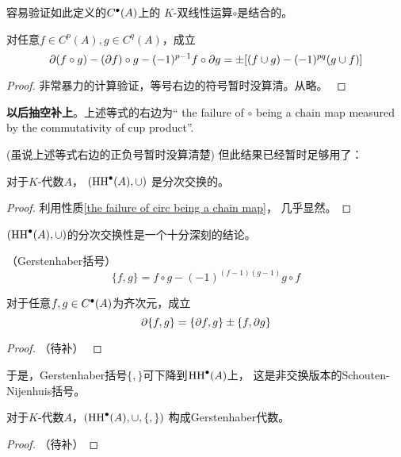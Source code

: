 容易验证如此定义的$C^{\bullet}(A)$上的
$K$-双线性运算$\circ$是结合的。


\begin{prop}
\label{the failure of circ being a chain map}
对任意$f\in C^p(A),g\in C^q(A)$，成立
$$\partial(f\circ g)-(\partial f)\circ g-(-1)^{p-1}f\circ\partial g
=\pm[(f\cup g)-(-1)^{pq}(g\cup f)]$$
\end{prop}

\begin{proof}
{
非常暴力的计算验证，等号右边的符号暂时没算清。从略。
}
\end{proof}

\textbf{以后抽空补上}。上述等式的右边为“
the failure of $\circ$ being a chain map 
measured by the commutativity of cup product”.

(虽说上述等式右边的正负号暂时没算清楚)
但此结果已经暂时足够用了：

\begin{cor}对于$K$-代数$A$，
$(\operatorname{HH}^{\bullet}(A),\cup)$%
是分次交换的。
\end{cor}

\begin{proof}
利用性质\ref{the failure of circ being a chain map}，
几乎显然。
\end{proof}

$(\operatorname{HH}^{\bullet}(A),\cup)$的分次交换性是一个十分深刻的结论。


\begin{definition}（Gerstenhaber括号）
$$\{f,g\}=f\circ g-(-1)^{(f-1)(g-1)}g\circ f$$
\end{definition}


\begin{prop}对于任意$f,g\in C^{\bullet}(A)$为齐次元，成立
$$\partial\{f,g\}=\{\partial f,g\}\pm\{f,\partial g\}$$
\end{prop}
\begin{proof}
{\color{red}
（待补）
}
\end{proof}

于是，Gerstenhaber括号$\{,\}$可下降到$\operatorname{HH}^{\bullet}(A)$上，
这是非交换版本的Schouten-Nijenhuis括号。

\begin{prop}
对于$K$-代数$A$，$(\operatorname{HH}^{\bullet}(A),\cup,\{,\})$
构成Gerstenhaber代数。
\end{prop}
\begin{proof}
{\color{red}
（待补）}
\end{proof}




